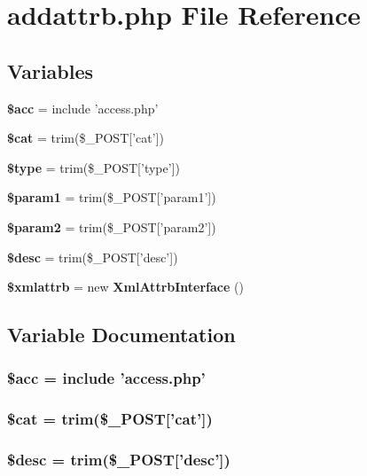 \section{addattrb.php File Reference}
\label{addattrb_8php}


\subsection*{Variables}
\begin{CompactItemize}
\item 
{\bf \$acc} = include 'access.php'
\item 
{\bf \$cat} = trim(\$\_\-POST['cat'])
\item 
{\bf \$type} = trim(\$\_\-POST['type'])
\item 
{\bf \$param1} = trim(\$\_\-POST['param1'])
\item 
{\bf \$param2} = trim(\$\_\-POST['param2'])
\item 
{\bf \$desc} = trim(\$\_\-POST['desc'])
\item 
{\bf \$xmlattrb} = new {\bf Xml\-Attrb\-Interface} ()
\end{CompactItemize}


\subsection{Variable Documentation}
\subsubsection{\setlength{\rightskip}{0pt plus 5cm}\$acc = include 'access.php'}\label{addattrb_8php_542926c588a05eb69553d79c83cf73da}


\subsubsection{\setlength{\rightskip}{0pt plus 5cm}\$cat = trim(\$\_\-POST['cat'])}\label{addattrb_8php_9e05c34c5aba2b3a1fcaadefe6f172eb}


\subsubsection{\setlength{\rightskip}{0pt plus 5cm}\$desc = trim(\$\_\-POST['desc'])}\label{addattrb_8php_31059b9e4d0c5af34df20da32232ea9a}


